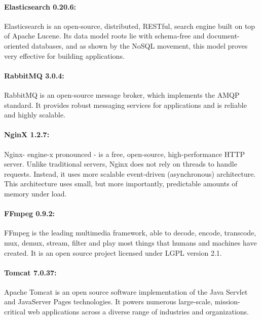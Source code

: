\paragraph{Elasticsearch 0.20.6:} Elasticsearch is an open-source, distributed, RESTful, search engine built on top of Apache Lucene. Its data model roots lie with schema-free and document-oriented databases, and as shown by the NoSQL movement, this model proves very effective for building applications.

\paragraph{RabbitMQ 3.0.4:} RabbitMQ is an open-source message broker, which implements the AMQP standard. It provides  robust messaging services for applications and is reliable and highly scalable.

\paragraph{NginX 1.2.7:} Nginx- engine-x pronounced - is a free, open-source, high-performance \ac{HTTP} server. Unlike traditional servers, Nginx does not rely on threads to handle requests. Instead, it uses more scalable event-driven (asynchronous) architecture. This architecture uses small, but more importantly, predictable amounts of memory under load.

\paragraph{FFmpeg 0.9.2:} FFmpeg is the leading multimedia framework, able to decode, encode, transcode, mux, demux, stream, filter and play most things that humans and machines have created. It is an open source project licensed under LGPL version 2.1.

\paragraph{Tomcat 7.0.37:} Apache Tomcat is an open source software implementation of the Java Servlet and JavaServer Pages technologies. It powers numerous large-scale, mission-critical web applications across a diverse range of industries and organizations.


